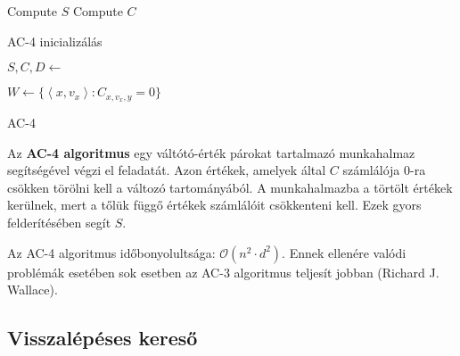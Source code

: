\begin{algorithm}[H]
    {
        Compute $S$ \;
        Compute $C$ \;
        \;
    }
    \caption{AC-4 inicializálás}
\end{algorithm}

\begin{algorithm}[H]
    {
        $S, C, D \gets$  \;

        $W \gets \{\left<x, v_x \right> : C_{x,v_x,y} = 0\} $

        \;
    }
    \caption{AC-4}
\end{algorithm}

Az {\bf AC-4 algoritmus} egy váltótó-érték párokat tartalmazó munkahalmaz
segítségével végzi el feladatát. Azon értékek, amelyek által $C$ számlálója $0$-ra
csökken törölni kell a változó tartományából. A munkahalmazba a törtölt értékek
kerülnek, mert a tőlük függő értékek számlálóit csökkenteni kell. Ezek gyors
felderítésében segít $S$.

\begin{megjegyzes}
    Az AC-4 algoritmus időbonyolultsága: $\mathcal{O}(n^2 \cdot d^2)$. Ennek ellenére valódi
    problémák esetében sok esetben az AC-3 algoritmus teljesít jobban (Richard
    J.  Wallace).
\end{megjegyzes}

\subsection{Visszalépéses kereső}
